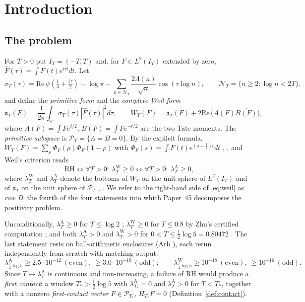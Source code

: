 \documentclass[11pt]{amsart}
\theoremstyle{definition}
\theoremstyle{remark}
\newcommand{\R}{\mathbb R}
\newcommand{\Rel}{\mathrm{Re}\,}
\newcommand{\PT}{\mathcal P_T}
\newcommand{\IT}{I_T}
\newcommand{\lamA}{\lambda^{\mathrm A}_T}
\newcommand{\lamW}{\lambda^{\mathrm W}_T}
\newcommand{\sT}{\sigma_T}
\newcommand{\Fh}{\widehat F}
\newcommand{\NT}{\mathcal N_T}
\begin{document}
\maketitle

\tableofcontents

\section{Introduction}\label{sec:intro}

\subsection{The problem}
For $T>0$ put $\IT=(-T,T)$ and, for $F\in L^2(\IT)$ extended by zero, $\Fh(\tau)=\int F(t)e^{i\tau t}dt$.
Let
\begin{equation}\label{eq:symbol}
\sT(\tau)=\Rel\psi\!\left(\tfrac14+\tfrac{i\tau}2\right)-\log\pi-\sum_{n\in\NT}\frac{2\Lambda(n)}{\sqrt n}\cos(\tau\log n),
\qquad \NT=\{n\ge2:\log n<2T\},
\end{equation}
and define the \emph{primitive form} and the \emph{complete Weil form}
\begin{equation}\label{eq:forms}
\mathfrak a_T(F)=\frac1{2\pi}\int_\R\sT(\tau)|\Fh(\tau)|^2d\tau,\qquad
W_T(F)=\mathfrak a_T(F)+2\Rel\big(A(F)\overline{B(F)}\big),
\end{equation}
where $A(F)=\int Fe^{t/2}$, $B(F)=\int Fe^{-t/2}$ are the two Tate moments. The \emph{primitive subspace}
is $\PT=\{A=B=0\}$. By the explicit formula, $W_T(F)=\sum_\rho\Phi_F(\rho)\Phi_F(1-\rho)$ with
$\Phi_F(s)=\int F(t)e^{(s-\frac12)t}dt$ \cite{Weil52}, \cite[Thm.~8.4]{Paper45}, and Weil's criterion
reads
\begin{equation}\label{eq:weil}
\mathrm{RH}\iff\forall T>0:\ \lamW\ge0\iff\forall T>0:\ \lamA\ge0,
\end{equation}
where $\lamW$ and $\lamA$ denote the bottoms of $W_T$ on the unit sphere of $L^2(\IT)$ and of $\mathfrak a_T$
on the unit sphere of $\PT$ \cite[Thm.~11.3]{Paper45}, \cite{Bombieri2000}. We refer to the right-hand
side of \eqref{eq:weil} as \emph{row D}, the fourth of the four statements into which Paper~45
decomposes the positivity problem.

Unconditionally, $\lamA\ge0$ for $T\le\log2$ \cite{Paper42}; $\lamW\ge0$ for $T\le0.8$ by Zhu's certified
computation \cite{Zhu2026}; and both $\lamA>0$ and $\lamW>0$ for $0<T\le\frac12\log5=0.80472$
\cite[Thm.~15.2]{Paper47}. The last statement rests on ball-arithmetic enclosures (Arb
\cite{Johansson2017}), each rerun independently from scratch with matching output:
\begin{equation}\label{eq:log5}
\lambda^{\mathrm A}_{\frac12\log5}\ge2.5\cdot10^{-12}\ (\text{even}),\ \ge3.0\cdot10^{-10}\ (\text{odd});\qquad
\lambda^{\mathrm W}_{\frac12\log5}\ge10^{-18}\ (\text{even}),\ \ge10^{-16}\ (\text{odd}).
\end{equation}
Since $T\mapsto\lamA$ is continuous \cite[Lem.~17.1]{Paper47} and non-increasing, a failure
of RH would produce a \emph{first contact}: a window $T_*>\frac12\log5$ with $\lambda^{\mathrm A}_{T_*}=0$
and $\lamA>0$ for $T<T_*$, together with a nonzero \emph{first-contact vector} $F\in\mathcal P_{T_*}$,
$H_{T_*}F=0$ (Definition~\ref{def:contact}).
\end{document}
